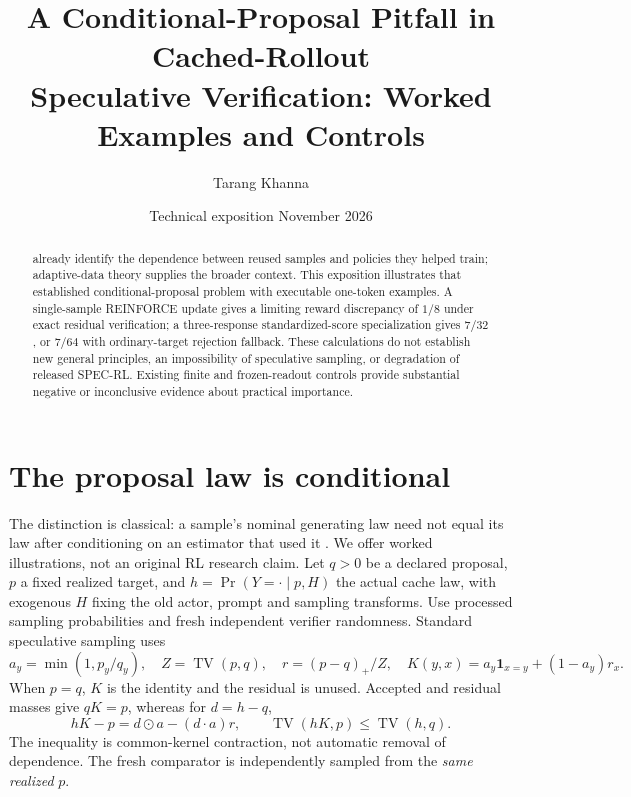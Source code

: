 \documentclass[10pt]{article}
\title{\vspace{-1.3cm}\textbf{A Conditional-Proposal Pitfall in Cached-Rollout\\Speculative Verification: Worked Examples and Controls}}
\author{Tarang Khanna}
\date{Technical exposition \;\textperiodcentered\; 18 November 2026}
\newcommand{\TV}{\operatorname{TV}}
\begin{document}
\maketitle\vspace{-0.7em}
\begin{abstract}
\citet[Appendix C.1]{arnal2026} already identify the dependence between reused samples and policies they helped train; adaptive-data theory supplies the broader context. This exposition illustrates that established conditional-proposal problem with executable one-token examples. A single-sample REINFORCE update gives a limiting reward discrepancy of $1/8$ under exact residual verification; a three-response standardized-score specialization gives $7/32$, or $7/64$ with ordinary-target rejection fallback. These calculations do not establish new general principles, an impossibility of speculative sampling, or degradation of released SPEC-RL. Existing finite and frozen-readout controls provide substantial negative or inconclusive evidence about practical importance.
\end{abstract}

\section{The proposal law is conditional}
The distinction is classical: a sample's nominal generating law need not equal its law after conditioning on an estimator that used it \citep{arnal2026,russo2016}. We offer worked illustrations, not an original RL research claim. Let $q>0$ be a declared proposal, $p$ a fixed realized target, and $h=\Pr(Y=\cdot\mid p,H)$ the actual cache law, with exogenous $H$ fixing the old actor, prompt and sampling transforms. Use processed sampling probabilities and fresh independent verifier randomness. Standard speculative sampling \citep{leviathan2023} uses
\[
 a_y=\min(1,p_y/q_y),\quad Z=\TV(p,q),\quad r=(p-q)_+/Z,\quad
 K(y,x)=a_y\mathbf1_{x=y}+(1-a_y)r_x.
\]
When $p=q$, $K$ is the identity and the residual is unused. Accepted and residual masses give $qK=p$, whereas for $d=h-q$,
\begin{equation}\label{eq:identity}
 hK-p=d\odot a-(d\cdot a)r,\qquad \TV(hK,p)\le\TV(h,q).
\end{equation}
The inequality is common-kernel contraction, not automatic removal of dependence. The fresh comparator is independently sampled from the \emph{same realized} $p$.
\end{document}
